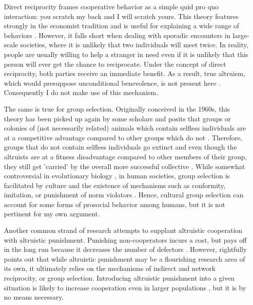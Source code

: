 \documentclass{JASSS}
\begin{document}
Direct reciprocity frames cooperative behavior as a simple quid pro quo interaction: you scratch my back and I will scratch yours. This theory features strongly in the economist tradition and is useful for explaining a wide range of behaviors \citep{Axelrod1981,Fehr2002}. However, it falls short when dealing with sporadic encounters in large-scale societies, where it is unlikely that two individuals will meet twice. In reality, people are usually willing to help a stranger in need even if it is unlikely that this person will ever get the chance to reciprocate. Under the concept of direct reciprocity, both parties receive an immediate benefit. As a result, true altruism, which would presuppose unconditional benevolence, is not present here \citep{Fehr2000}. Consequently I do not make use of this mechanism.

The same is true for group selection. Originally conceived in the 1960s, this theory has been picked up again by some scholars and posits that groups or colonies of (not necessarily related) animals which contain selfless individuals are at a competitive advantage compared to other groups which do not \citep{Heschl1994}. Therefore, groups that do not contain selfless individuals go extinct and even though the altruists are at a fitness disadvantage compared to other members of their group, they still get 'carried' by the overall more successful collective \citep{samir2009}. While somewhat controversial in evolutionary biology \citep{Abbot2013}, in human societies, group selection is facilitated by culture and the existence of mechanisms such as conformity, imitation, or punishment of norm violators \citep{Boyd1985,Soltis1995,Henrich2003,Richerson2016}. Hence, cultural group selection can account for some forms of prosocial behavior among humans, but it is not pertinent for my own argument.

Another common strand of research attempts to supplant altruistic cooperation with altruistic punishment. Punishing non-cooperators incurs a cost, but pays off in the long run because it decreases the number of defectors \citep{Fehr2002,boyd2003}. However, \cite{Nowak2006a} rightfully points out that while altruistic punishment may be a flourishing research area of its own, it ultimately relies on the mechanisms of indirect and network reciprocity, or group selection. Introducing altruistic punishment into a given situation is likely to increase cooperation even in larger populations \citep{Tang2016}, but it is by no means necessary.
\end{document}
